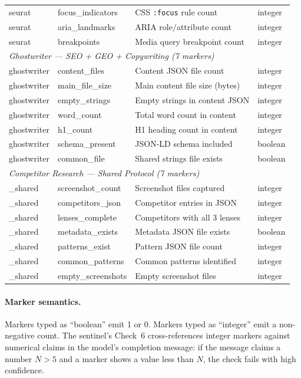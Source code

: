 \begin{table}[h]
\begin{tabular}{llll}
seurat & focus\_indicators & CSS \texttt{:focus} rule count & integer \\
seurat & aria\_landmarks & ARIA role/attribute count & integer \\
seurat & breakpoints & Media query breakpoint count & integer \\
\midrule
\multicolumn{4}{l}{\textit{Ghostwriter --- SEO + GEO + Copywriting (7 markers)}} \\
ghostwriter & content\_files & Content JSON file count & integer \\
ghostwriter & main\_file\_size & Main content file size (bytes) & integer \\
ghostwriter & empty\_strings & Empty strings in content JSON & integer \\
ghostwriter & word\_count & Total word count in content & integer \\
ghostwriter & h1\_count & H1 heading count in content & integer \\
ghostwriter & schema\_present & JSON-LD schema included & boolean \\
ghostwriter & common\_file & Shared strings file exists & boolean \\
\midrule
\multicolumn{4}{l}{\textit{Competitor Research --- Shared Protocol (7 markers)}} \\
\_shared & screenshot\_count & Screenshot files captured & integer \\
\_shared & competitors\_json & Competitor entries in JSON & integer \\
\_shared & lenses\_complete & Competitors with all 3 lenses & integer \\
\_shared & metadata\_exists & Metadata JSON file exists & boolean \\
\_shared & patterns\_exist & Pattern JSON file count & integer \\
\_shared & common\_patterns & Common patterns identified & integer \\
\_shared & empty\_screenshots & Empty screenshot files & integer \\
\bottomrule
\end{tabular}
\end{table}

\paragraph{Marker semantics.}
Markers typed as ``boolean'' emit 1 or 0. Markers typed as ``integer'' emit
a non-negative count. The sentinel's Check~6 cross-references integer markers
against numerical claims in the model's completion message: if the message
claims a number $N > 5$ and a marker shows a value less than $N$, the check
fails with high confidence.


